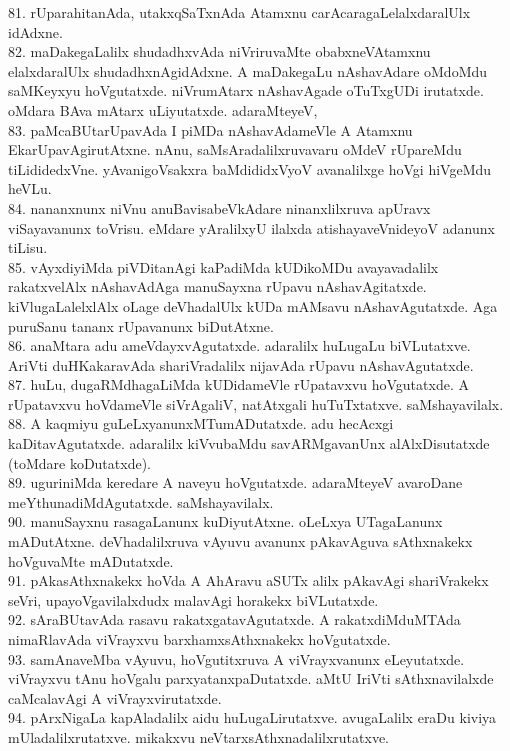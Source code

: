 \documentclass{article}
\begin{document}
81. rUparahitanAda, utakxqSaTxnAda Atamxnu carAcaragaLelalxdaralUlx idAdxne.\\
82. maDakegaLalilx shudadhxvAda niVriruvaMte obabxneVAtamxnu elalxdaralUlx shudadhxnAgidAdxne. A maDakegaLu nAshavAdare oMdoMdu saMKeyxyu hoVgutatxde. niVrumAtarx nAshavAgade oTuTxgUDi irutatxde. oMdara BAva mAtarx uLiyutatxde. adaraMteyeV,\\
83. paMcaBUtarUpavAda I piMDa nAshavAdameVle A Atamxnu EkarUpavAgirutAtxne. nAnu, saMsAradalilxruvavaru oMdeV rUpareMdu tiLididedxVne. yAvanigoVsakxra baMdididxVyoV avanalilxge hoVgi hiVgeMdu heVLu.\\
84. nananxnunx niVnu anuBavisabeVkAdare ninanxlilxruva apUravx viSayavanunx toVrisu. eMdare yAralilxyU ilalxda atishayaveVnideyoV adanunx tiLisu.\\
85. vAyxdiyiMda piVDitanAgi kaPadiMda kUDikoMDu avayavadalilx rakatxvelAlx nAshavAdAga manuSayxna rUpavu nAshavAgitatxde. kiVlugaLalelxlAlx oLage deVhadalUlx kUDa mAMsavu nAshavAgutatxde. Aga puruSanu tananx rUpavanunx biDutAtxne.\\
86. anaMtara adu ameVdayxvAgutatxde. adaralilx huLugaLu biVLutatxve. AriVti duHKakaravAda shariVradalilx nijavAda rUpavu nAshavAgutatxde.\\
87. huLu, dugaRMdhagaLiMda kUDidameVle rUpatavxvu hoVgutatxde. A rUpatavxvu hoVdameVle siVrAgaliV, natAtxgali huTuTxtatxve. saMshayavilalx.\\
88. A kaqmiyu guLeLxyanunxMTumADutatxde. adu hecAcxgi kaDitavAgutatxde. adaralilx kiVvubaMdu savARMgavanUnx alAlxDisutatxde (toMdare koDutatxde).\\
89. uguriniMda keredare A naveyu hoVgutatxde. adaraMteyeV avaroDane meYthunadiMdAgutatxde. saMshayavilalx.\\
90. manuSayxnu rasagaLanunx kuDiyutAtxne. oLeLxya UTagaLanunx mADutAtxne. deVhadalilxruva vAyuvu avanunx pAkavAguva sAthxnakekx hoVguvaMte mADutatxde.\\
91. pAkasAthxnakekx hoVda A AhAravu aSUTx alilx pAkavAgi shariVrakekx seVri, upayoVgavilalxdudx malavAgi horakekx biVLutatxde.\\
92. sAraBUtavAda rasavu rakatxgatavAgutatxde. A rakatxdiMduMTAda nimaRlavAda viVrayxvu barxhamxsAthxnakekx hoVgutatxde.\\
93. samAnaveMba vAyuvu, hoVgutitxruva A viVrayxvanunx eLeyutatxde. viVrayxvu tAnu hoVgalu parxyatanxpaDutatxde. aMtU IriVti sAthxnavilalxde caMcalavAgi A viVrayxvirutatxde.\\
94. pArxNigaLa kapAladalilx aidu huLugaLirutatxve. avugaLalilx eraDu kiviya mUladalilxrutatxve. mikakxvu neVtarxsAthxnadalilxrutatxve.\\
\end{document}
